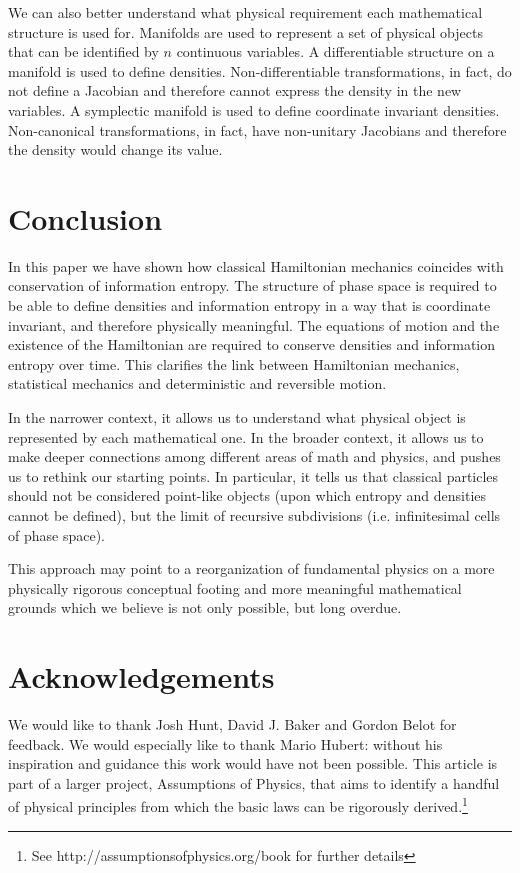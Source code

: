 \documentclass[11pt]{elsarticle}
\begin{document}
We can also better understand what physical requirement each mathematical structure is used for. Manifolds are used to represent a set of physical objects that can be identified by $n$ continuous variables.  A differentiable structure on a manifold is used to define densities. Non-differentiable transformations, in fact, do not define a Jacobian and therefore cannot express the density in the new variables. A symplectic manifold is used to define coordinate invariant densities. Non-canonical transformations, in fact, have non-unitary Jacobians and therefore the density would change its value.

\section{Conclusion}

In this paper we have shown how classical Hamiltonian mechanics coincides with conservation of information entropy. The structure of phase space is required to be able to define densities and information entropy in a way that is coordinate invariant, and therefore physically meaningful. The equations of motion and the existence of the Hamiltonian are required to conserve densities and information entropy over time. This clarifies the link between Hamiltonian mechanics, statistical mechanics and deterministic and reversible motion.

In the narrower context, it allows us to understand what physical object is represented by each mathematical one. In the broader context, it allows us to make deeper connections among different areas of math and physics, and pushes us to rethink our starting points. In particular, it tells us that classical particles should not be considered point-like objects (upon which entropy and densities cannot be defined), but the limit of recursive subdivisions (i.e. infinitesimal cells of phase space).

This approach may point to a reorganization of fundamental physics on a more physically rigorous conceptual footing and more meaningful mathematical grounds which we believe is not only possible, but long overdue.

\section*{Acknowledgements}

We would like to thank Josh Hunt, David J. Baker and Gordon Belot for feedback. We would especially like to thank Mario Hubert: without his inspiration and guidance this work would have not been possible. This article is part of a larger project, Assumptions of Physics, that aims to identify a handful of physical principles from which the basic laws can be rigorously derived.\footnote{See http://assumptionsofphysics.org/book for further details}



{}
\end{document}
